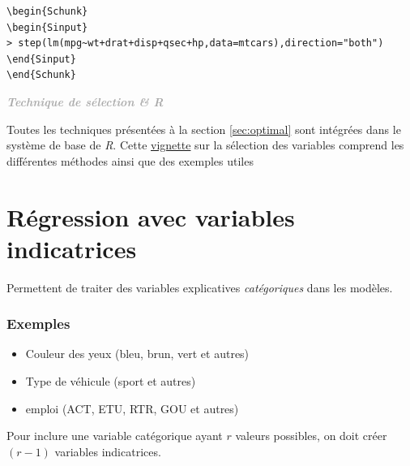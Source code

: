 \documentclass[11pt,french]{report}
\newenvironment{moreInfo}[1]
	{\begin{mdframed}
	\textcolor{darkgray}{\huge \raisebox{-3.5pt}{\faInfo} 
	\hspace{0.5cm} \large\bfseries #1}\\[5pt]
	\normalsize
	\makebox[0.1\textwidth][l]{}	
	\begin{minipage}{10cm}}
	{	\end{minipage}
	\end{mdframed}}
\begin{document}
\begin{lstlisting}[linerange=\\begin\{Sinput\}-\\end\{Sinput\},includerangemarker=false, caption = Code source en R pour l'exemple]
\begin{Schunk}
\begin{Sinput}
> step(lm(mpg~wt+drat+disp+qsec+hp,data=mtcars),direction="both")
\end{Sinput}
\end{Schunk}
\end{lstlisting}

\begin{moreInfo}{\emph{Technique de sélection \& \emph{R}}}
	Toutes les techniques présentées à la section \ref{sec:optimal} sont intégrées dans le système de base de \emph{R}. Cette \href{https://cran.r-project.org/web/packages/olsrr/vignettes/variable_selection.html}{vignette} sur la sélection des variables comprend les différentes méthodes ainsi que des exemples utiles
\end{moreInfo}

\section{Régression avec variables indicatrices}
Permettent de traiter des variables explicatives \emph{catégoriques} dans les modèles.
\subsubsection*{Exemples}
\begin{itemize}
\item Couleur des yeux (bleu, brun, vert et autres)
\item Type de véhicule (sport et autres)
\item emploi (ACT, ETU, RTR, GOU et autres)
\end{itemize}

Pour inclure une variable catégorique ayant $r$ valeurs possibles, on doit créer $(r-1)$ variables indicatrices.
\end{document}
